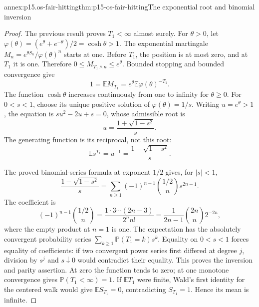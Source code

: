 \begin{annexitem}{annex:p15.os-fair-hitting}{thm:p15-os-fair-hitting}{The exponential root and binomial inversion}
\begin{proof}
The previous result proves \(T_1<\infty\) almost surely.
For \(\theta>0\), let
\(\varphi(\theta)=(e^\theta+e^{-\theta})/2=\cosh\theta>1\).
The exponential martingale
\(M_n=e^{\theta S_n}/\varphi(\theta)^n\) starts at one.
Before \(T_1\), the position is at most zero, and at \(T_1\)
it is one. Therefore \(0\leq M_{T_1\wedge n}\leq e^\theta\).
Bounded stopping and bounded convergence give
\[
 1=\mathbb EM_{T_1}
   =e^\theta\mathbb E\varphi(\theta)^{-T_1}.
 \]
The function \(\cosh\theta\) increases continuously from one
to infinity for \(\theta\geq0\).
For \(0<s<1\), choose its unique positive solution of
\(\varphi(\theta)=1/s\).
Writing \(u=e^\theta>1\), the equation is
\(su^2-2u+s=0\), whose admissible root is
\[
 u=\frac{1+\sqrt{1-s^2}}s.
 \]
The generating function is its reciprocal, not this root:
\[
 \mathbb Es^{T_1}=u^{-1}
                  =\frac{1-\sqrt{1-s^2}}s.
 \]

The proved binomial-series formula at exponent \(1/2\) gives,
for \(|s|<1\),
\[
 \frac{1-\sqrt{1-s^2}}s
 =\sum_{n\geq1}(-1)^{n-1}\binom{1/2}{n}s^{2n-1}.
 \]
The coefficient is
\[
 (-1)^{n-1}\binom{1/2}{n}
 =\frac{1\cdot3\cdots(2n-3)}{2^n n!}
 =\frac1{2n-1}\binom{2n}{n}2^{-2n},
 \]
where the empty product at \(n=1\) is one.
The expectation has the absolutely convergent probability series
\(\sum_{k\geq1}\mathbb P(T_1=k)s^k\).
Equality on \(0<s<1\) forces equality of coefficients:
if two convergent power series first differed at degree \(j\),
division by \(s^j\) and \(s\downarrow0\) would contradict
their equality. This proves the inversion and parity assertion.
At zero the function tends to zero; at one monotone convergence
gives \(\mathbb P(T_1<\infty)=1\).
If \(\mathbb ET_1\) were finite, Wald's first identity for the
centered walk would give \(\mathbb ES_{T_1}=0\), contradicting
\(S_{T_1}=1\). Hence its mean is infinite.
\end{proof}
\end{annexitem}

